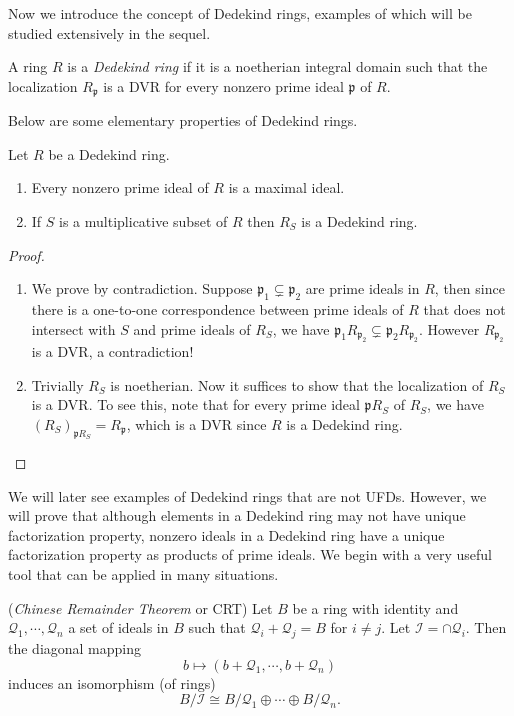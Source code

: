 Now we introduce the concept of Dedekind rings, examples of which will be studied extensively in the sequel.
\begin{definition}
A ring $R$ is a \textit{Dedekind ring} if it is a noetherian integral domain such that the localization $R_\mathfrak{p}$ is a DVR for every nonzero prime ideal $\mathfrak{p}$ of $R$.
\end{definition}
Below are some elementary properties of Dedekind rings.
\begin{proposition}
Let $R$ be a Dedekind ring.
\begin{enumerate}
    \item Every nonzero prime ideal of $R$ is a maximal ideal.
    \item If $S$ is a multiplicative subset of $R$ then $R_S$ is a Dedekind ring.
\end{enumerate}
\end{proposition}
\begin{proof}
\begin{enumerate}
    \item We prove by contradiction. Suppose $\mathfrak{p}_1\subsetneq\mathfrak{p}_2$ are prime ideals in $R$, then since there is a one-to-one correspondence between prime ideals of $R$ that does not intersect with $S$ and prime ideals of $R_S$, we have $\mathfrak{p}_1R_{\mathfrak{p}_2}\subsetneq\mathfrak{p}_2R_{\mathfrak{p}_2}$. However $R_{\mathfrak{p}_2}$ is a DVR, a contradiction!
    \item Trivially $R_S$ is noetherian. Now it suffices to show that the localization of $R_S$ is a DVR. To see this, note that for every prime ideal $\mathfrak{p}R_S$ of $R_S$, we have $(R_S)_{\mathfrak{p}R_S}=R_\mathfrak{p}$, which is a DVR since $R$ is a Dedekind ring.
\end{enumerate}
\end{proof}
We will later see examples of Dedekind rings that are not UFDs. However, we will prove that although elements in a Dedekind ring may not have unique factorization property, nonzero ideals in a Dedekind ring have a unique factorization property as products of prime ideals. We begin with a very useful tool that can be applied in many situations.
\begin{theorem}{(\textit{Chinese Remainder Theorem} or CRT)}\label{CRTrings}
Let $B$ be a ring with identity and $\mathcal{Q}_1,\cdots,\mathcal{Q}_n$ a set of ideals in $B$ such that $\mathcal{Q}_i+\mathcal{Q}_j=B$ for $i\ne j$. Let $\mathcal{I}=\cap\mathcal{Q}_i$. Then the diagonal mapping 
$$b\mapsto \left( b+\mathcal{Q} _1,\cdots ,b+\mathcal{Q} _n \right) $$
induces an isomorphism (of rings) 
$$B/\mathcal{I} \cong B/\mathcal{Q} _1\oplus \cdots \oplus B/\mathcal{Q} _n.$$
\end{theorem}
